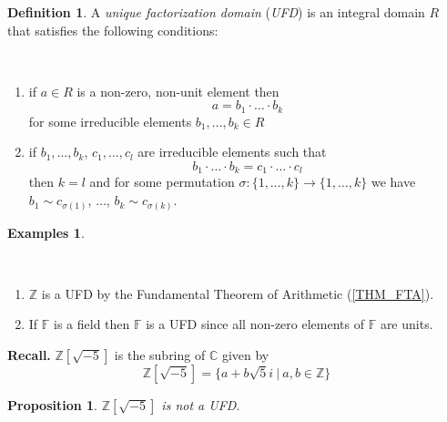 \documentclass[12pt, letterpaper, oneside]{article}
\theoremstyle{plain}
\newtheorem{proposition}[theorem]{Proposition}
\theoremstyle{definition}
\newtheorem{definition}[theorem]{Definition}
\newtheorem{examples}[theorem]{Examples}
\newcommand{\Z}{{\mathbb Z}}
\newcommand{\C}{{\mathbb C}}
\newcommand{\F}{{\mathbb F}}
\newcommand{\benu}{\begin{enumerate}}
\newcommand{\eenu}{\end{enumerate}}
\newcommand{\vs}{\vskip 5mm}
\newcommand{\isep}[1][0]{\setlength{\itemsep}{#1 mm}}
\begin{document}
\vs\vs


\begin{definition}
\label{DEF_UFD}
A  \emph{unique factorization domain} (\emph{UFD}) is an integral domain $R$ 
that satisfies the following conditions:

\vskip -13mm

\ 
\benu
\isep[3]
\item  if $a\in R$ is a non-zero, non-unit element then 
$$a= b_{1}\cdot {\dots} \cdot b_{k}$$
for some irreducible elements $b_{1}, \dots, b_{k}\in R$
\item if $b_{1}, \dots, b_{k}$, $c_{1}, \dots, c_{l}$ are irreducible elements such that 
$$ b_{1}\cdot {\dots} \cdot b_{k} = c_{1}\cdot {\dots} \cdot c_{l}$$
then $k=l$ and for some permutation $\sigma\colon \{1, \dots, k\} \to \{1, \dots, k\}$ we have 
$b_{1}\sim c_{\sigma(1)}$, $\dots$, $b_{k}\sim c_{\sigma(k)}$.
\eenu


\end{definition}

\vs\vs

\begin{examples}\ 

\vskip -11mm

\ 
\benu
\isep[5]
\item $\Z$ is a UFD by the Fundamental Theorem of Arithmetic (\ref{THM_FTA}).
\item If $\F$ is a field then $\F$ is a UFD since all non-zero elements of $\F$ are units.

\eenu 

\end{examples}

\vs\vs

\textbf{Recall.} $\Z[\sqrt{-5}] $ is the subring of $\C$ given by 
$$\Z[\sqrt{-5}] = \{ a + b\sqrt{5}i \ | \  a, b\in \Z \}$$ 

\vs\vs

\begin{proposition}
\label{PROP_ZSQRT-5NOTUFD}
$\Z[\sqrt{-5}] $ is not a UFD.
\end{proposition}

\vs\vs
\end{document}
